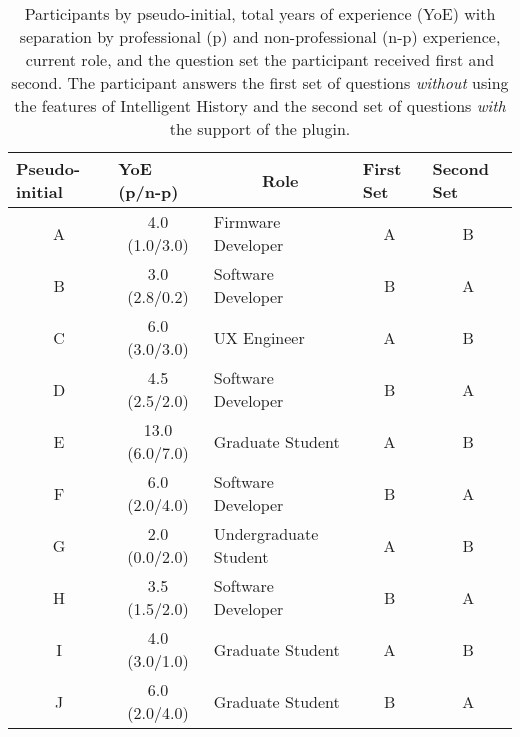 \begin{table}[h]
  \centering
  \begin{tabular}{@{}cclcc@{}}
  \toprule
  \multicolumn{1}{l}{Pseudo-initial} & \multicolumn{1}{l}{YoE (p/n-p)} & \multicolumn{1}{c}{Role} & \multicolumn{1}{l}{First Set} & \multicolumn{1}{l}{Second Set} \\ \midrule
  A                                  & 4.0 (1.0/3.0)                     & Firmware Developer       & A                                  & B                               \\
  B                                  & 3.0 (2.8/0.2)                     & Software Developer       & B                                  & A                               \\
  C                                  & 6.0 (3.0/3.0)                     & UX Engineer              & A                                  & B                               \\
  D                                  & 4.5 (2.5/2.0)                     & Software Developer       & B                                  & A                               \\
  E                                  & 13.0 (6.0/7.0)                    & Graduate Student         & A                                  & B                               \\
  F                                  & 6.0 (2.0/4.0)                     & Software Developer       & B                                  & A                               \\
  G                                  & 2.0 (0.0/2.0)                     & Undergraduate Student    & A                                  & B                               \\
  H                                  & 3.5 (1.5/2.0)                     & Software Developer       & B                                  & A                               \\
  I                                  & 4.0 (3.0/1.0)                     & Graduate Student         & A                                  & B                               \\
  J                                  & 6.0 (2.0/4.0)                     & Graduate Student         & B                                  & A                               \\ \bottomrule
  \end{tabular}
  \caption{
    Participants by pseudo-initial, total years of experience (YoE) with separation by professional (p) and non-professional (n-p) experience, current role, and the question set the participant received first and second.
    The participant answers the first set of questions \emph{without} using the features of Intelligent History and the second set of questions \emph{with} the support of the plugin.
  }
  \label{tab:Participants}
\end{table}

